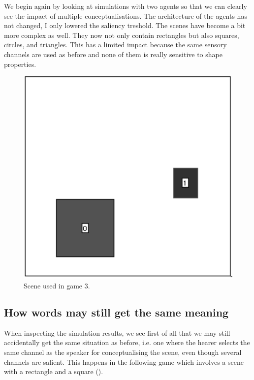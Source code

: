 We begin again by looking at simulations
with two agents so that we 
can clearly see the impact of multiple conceptualisations. 
The architecture of the agents has not changed, I only 
lowered the saliency treshold. 
The scenes have become a bit more complex as well. They 
now not only contain rectangles but also squares, circles, 
and triangles. This has a limited impact because the 
same sensory channels are used as before and none of them 
is really sensitive to shape properties. 
\begin{figure}[htbp]
  \centerline{\includegraphics[width=.40\textwidth]{chap6/figs/scene-game3}}
\caption{\label{scene-game3} Scene used
in game 3.}
\end{figure}

\subsection{How words may still get the same meaning}

When inspecting the simulation results, we see                          
first of all that 
we may still accidentally get the same situation
as before, i.e. one where the hearer selects 
the same channel as the speaker for conceptualising 
the scene, even though several channels 
are salient. This happens in the
following game which involves a scene with a rectangle
and a square (). 

